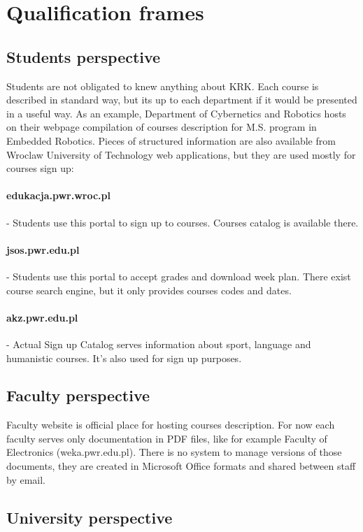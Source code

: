 \documentclass[printmode]{mgr}
\begin{document}
\section{Qualification frames}

\subsection{Students perspective}
Students are not obligated to knew anything about KRK. Each course is described
in standard way, but its up to each department if it would be presented in a
useful way. As an example, Department of Cybernetics and Robotics hosts on
their webpage compilation of courses description for M.S. program in Embedded
Robotics\cite{web:aer-krk}. Pieces of structured information are also available
from Wroclaw University of Technology web applications, but they are used
mostly for courses sign up:
\paragraph{edukacja.pwr.wroc.pl} -
Students use this portal to sign up to courses. Courses catalog is available
there.
\paragraph{jsos.pwr.edu.pl} -
Students use this portal to accept grades and download week plan. There exist
course search engine, but it only provides courses codes and dates.
\paragraph{akz.pwr.edu.pl} -
Actual Sign up Catalog serves information about sport, language and
humanistic courses. It's also used for sign up purposes.


\subsection{Faculty perspective}
Faculty website is official place for hosting courses description. For now
each faculty serves only documentation in PDF files, like for example Faculty
of Electronics (weka.pwr.edu.pl). There is no system to manage versions of
those documents, they are created in Microsoft Office formats and shared
between staff by email.

\subsection{University perspective}
\end{document}
